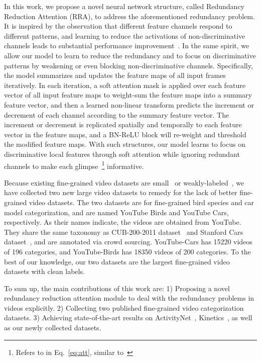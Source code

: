 \documentclass[runningheads]{llncs}
\begin{document}
In this work, we propose a novel neural network structure, called Redundancy Reduction Attention (RRA), to address the aforementioned redundancy problem. It is inspired by the observation that different feature channels respond to different patterns, and learning to reduce the activations of non-discriminative channels leads to substantial performance improvement~\cite{hu2017squeeze,Zheng_2017_ICCV}. In the same spirit, we allow our model to learn to reduce the redundancy and to focus on discriminative patterns by weakening or even blocking non-discriminative channels. Specifically, the model summarizes and updates the feature maps of all input frames iteratively. In each iteration, a soft attention mask is applied over each feature vector of all input feature maps to weight-sum the feature maps into a summary feature vector, and then a learned non-linear transform predicts the increment or decrement of each channel according to the summary feature vector. The increment or decrement is replicated spatially and temporally to each feature vector in the feature maps, and a BN-ReLU block will re-weight and threshold the modified feature maps. With such structures, our model learns to focus on discriminative local features through soft attention while ignoring redundant channels to make each glimpse~\footnote{Refers to  in Eq.~\ref{eq:att}, similar to~\cite{larochelle2010learning}} informative.

Because existing fine-grained video datasets are small~\cite{saito2016ibc127} or weakly-labeled~\cite{karpathy2014large}, we have collected two new large video datasets to remedy for the lack of better fine-grained video datasets. The two datasets are for fine-grained bird species and car model categorization, and are named YouTube Birds and YouTube Cars, respectively. As their names indicate, the videos are obtained from YouTube. They share the same taxonomy as CUB-200-2011 dataset~\cite{WahCUB_200_2011} and Stanford Cars dataset~\cite{krause20133d}, and are annotated via crowd sourcing. YouTube-Cars has 15220 videos of 196 categories, and YouTube-Birds has 18350 videos of 200 categories. To the best of our knowledge, our two datasets are the largest fine-grained video datasets with clean labels.

To sum up, the main contributions of this work are: 1) Proposing a novel redundancy reduction attention module to deal with the redundancy problems in videos explicitly. 2) Collecting two published fine-grained video categorization datasets.  3) Achieving state-of-the-art results on ActivityNet~\cite{caba2015activitynet}, Kinetics~\cite{kay2017kinetics}, as well as our newly collected datasets.
\end{document}
